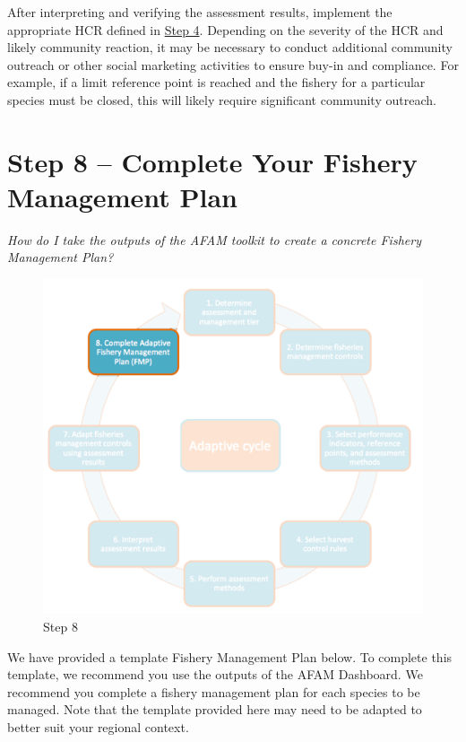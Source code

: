 \documentclass[]{book}
\begin{document}
After interpreting and verifying the assessment results, implement the
appropriate HCR defined in \protect\hyperlink{Step4}{Step 4}. Depending
on the severity of the HCR and likely community reaction, it may be
necessary to conduct additional community outreach or other social
marketing activities to ensure buy-in and compliance. For example, if a
limit reference point is reached and the fishery for a particular
species must be closed, this will likely require significant community
outreach.

\hypertarget{Step8}{\chapter{Step 8 -- Complete Your Fishery Management
Plan}\label{Step8}}

\emph{How do I take the outputs of the AFAM toolkit to create a concrete
Fishery Management Plan?}

\begin{figure}
\centering
\includegraphics{myMediaFolder/media/Step8.png}
\caption{\label{fig:Step8}Step 8}
\end{figure}

We have provided a template Fishery Management Plan below. To complete
this template, we recommend you use the outputs of the AFAM Dashboard.
We recommend you complete a fishery management plan for each species to
be managed. Note that the template provided here may need to be adapted
to better suit your regional context.
\end{document}
